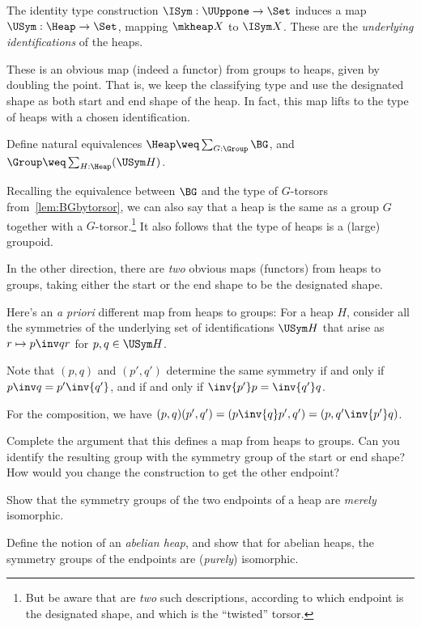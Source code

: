 The identity type construction $\ISym : \UUppone \to \Set$
induces a map $\USym : \Heap \to \Set$,
mapping $\mkheap X$ to $\ISym X$.
These are the \emph{underlying identifications} of the heaps.

These is an obvious map (indeed a functor) from groups to heaps,
given by doubling the point.
That is, we keep the classifying type and use the designated shape
as both start and end shape of the heap.
In fact, this map lifts to the type of heaps with a chosen identification.
\begin{exercise}\label{xca:group+torsor-heap}
  Define natural equivalences $\Heap \weq \sum_{G:\Group}\BG$,
  and $\Group \weq \sum_{H:\Heap}(\USym H)$.
\end{exercise}
Recalling the equivalence between $\BG$ and the type of $G$-torsors
from~\cref{lem:BGbytorsor},
we can also say that a heap is the same
as a group $G$ together with a $G$-torsor.\footnote{%
  But be aware that are \emph{two} such descriptions,
  according to which endpoint is the designated shape,
  and which is the ``twisted'' torsor.}
It also follows that the type of heaps is a (large) groupoid.

In the other direction,
there are \emph{two} obvious maps (functors) from heaps to groups,
taking either the start or the end shape to be the designated shape.

Here's an \emph{a priori} different map from heaps to groups:
For a heap $H$, consider all the
symmetries of the underlying set of identifications $\USym H$
that arise as $r \mapsto p\inv q r$ for $p,q\in \USym H$.

Note that $(p,q)$ and $(p',q')$ determine the same symmetry
if and only if $p\inv q = p'\inv{q'}$, and if and only if
$\inv{p'}p = \inv{q'}q$.

For the composition, we have $(p,q)(p',q') = (p\inv{q}p',q') = (p,q'\inv{p'}q)$.

\begin{exercise}
  Complete the argument that this defines a map
  from heaps to groups. Can you identify the resulting group
  with the symmetry group of the start or end shape?
  How would you change the construction to get the other endpoint?
\end{exercise}

\begin{exercise}
  Show that the symmetry groups of the two endpoints of a heap
  are \emph{merely} isomorphic.

  Define the notion of an \emph{abelian heap},
  and show that for abelian heaps,
  the symmetry groups of the endpoints are (\emph{purely}) isomorphic.
\end{exercise}

